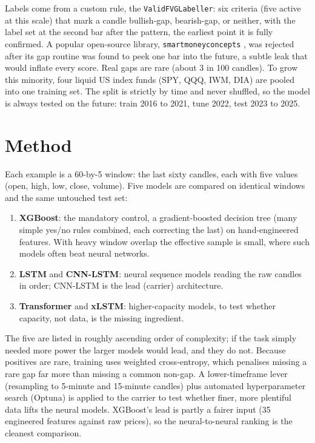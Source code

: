 \documentclass[10pt, twocolumn, letterpaper]{article}
\begin{document}
Labels come from a custom rule, the \texttt{ValidFVGLabeller}: six criteria (five active at this scale) that mark a candle bullish-gap, bearish-gap, or neither, with the label set at the second bar after the pattern, the earliest point it is fully confirmed. A popular open-source library, \texttt{smartmoneyconcepts} \cite{smc}, was rejected after its gap routine was found to peek one bar into the future, a subtle leak that would inflate every score. Real gaps are rare (about 3 in 100 candles). To grow this minority, four liquid US index funds (SPY, QQQ, IWM, DIA) are pooled into one training set. The split is strictly by time and never shuffled, so the model is always tested on the future: train 2016 to 2021, tune 2022, test 2023 to 2025.

\section{Method}
Each example is a 60-by-5 window: the last sixty candles, each with five values (open, high, low, close, volume). Five models are compared on identical windows and the same untouched test set:
\begin{enumerate}
    \item \textbf{XGBoost}: the mandatory control, a gradient-boosted decision tree (many simple yes/no rules combined, each correcting the last) on hand-engineered features. With heavy window overlap the effective sample is small, where such models often beat neural networks.
    \item \textbf{LSTM} and \textbf{CNN-LSTM}: neural sequence models reading the raw candles in order; CNN-LSTM is the lead (carrier) architecture.
    \item \textbf{Transformer} and \textbf{xLSTM}: higher-capacity models, to test whether capacity, not data, is the missing ingredient.
\end{enumerate}
The five are listed in roughly ascending order of complexity; if the task simply needed more power the larger models would lead, and they do not. Because positives are rare, training uses weighted cross-entropy, which penalises missing a rare gap far more than missing a common non-gap. A lower-timeframe lever (resampling to 5-minute and 15-minute candles) plus automated hyperparameter search (Optuna) is applied to the carrier to test whether finer, more plentiful data lifts the neural models. XGBoost's lead is partly a fairer input (35 engineered features against raw prices), so the neural-to-neural ranking is the cleanest comparison.
\end{document}
